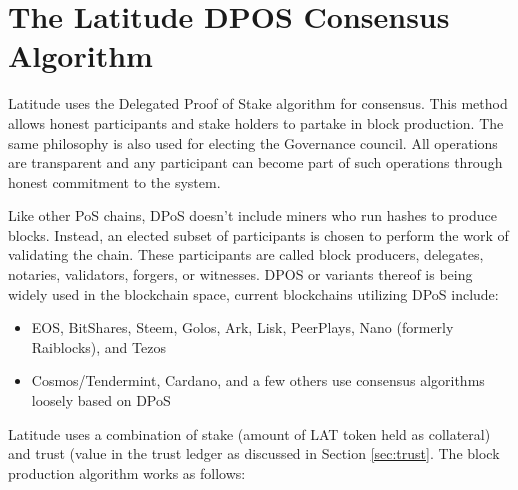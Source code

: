 \newpage
\section{The Latitude DPOS Consensus Algorithm}
\label{app:dpos}

Latitude uses the Delegated Proof of Stake algorithm for consensus. This method allows honest participants and stake
holders to partake in block production. The same philosophy is also used for electing the Governance council. All
operations are transparent and any participant can become part of such operations through honest commitment to the
system.

Like other PoS chains, DPoS doesn't include miners who run hashes to produce blocks. Instead, an elected subset of
participants is chosen to perform the work of validating the chain. These participants are called block producers,
delegates, notaries, validators, forgers, or witnesses. DPOS or variants thereof is being widely used in the blockchain
space, current blockchains utilizing DPoS include:

\begin{itemize}
\item EOS, BitShares, Steem, Golos, Ark, Lisk, PeerPlays, Nano (formerly Raiblocks), and Tezos
\item Cosmos/Tendermint, Cardano, and a few others use consensus algorithms loosely based on DPoS
\end{itemize}

Latitude uses a combination of stake (amount of LAT token held as collateral) and trust (value in the trust ledger as
discussed in Section \ref{sec:trust}. The block production algorithm works as follows:

